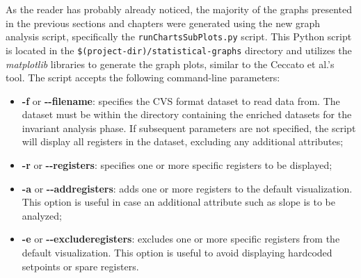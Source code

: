 
\bigskip
As the reader has probably already noticed, the majority of the graphs presented in the previous sections and chapters were generated using the new graph analysis script, specifically the \texttt{runChartsSubPlots.py} script. This Python script is located in the \texttt{\$(project-dir)/statistical-graphs} directory and utilizes the \textit{matplotlib} libraries to generate the graph plots, similar to the Ceccato et al.'s tool.\newline 
The script accepts the following command-line parameters:

\begin{itemize}
	\item \textbf{-f} or \textbf{{-}{-}filename}: specifies the CVS format dataset to read data from. The dataset must be within the directory containing the enriched datasets for the invariant analysis phase. If subsequent parameters are not specified, the script will display all registers in the dataset, excluding any additional attributes;
	
	\item \textbf{-r} or \textbf{{-}{-}registers}: specifies one or more specific registers to be displayed;
	
	\item \textbf{-a} or \textbf{{-}{-}addregisters}: adds one or more registers to the default visualization. This option is useful in case an additional attribute such as slope is to be analyzed;
	
	\item \textbf{-e} or \textbf{{-}{-}excluderegisters}: excludes one or more specific registers from the default visualization. This option is useful to avoid displaying hardcoded setpoints or spare registers.
\end{itemize}


